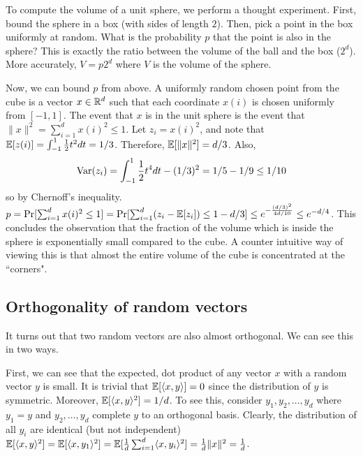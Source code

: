 \documentclass{article}
\begin{document}
To compute the volume of a unit sphere, we perform a thought experiment.
First, bound the sphere in a box (with sides of length $2$).
Then, pick a point in the box uniformly at random. What is the probability $p$ that
the point is also in the sphere? This is exactly the ratio between the volume of the ball and the box ($2^d$).
More accurately, $V = p2^d$ where $V$ is the volume of the sphere.

Now, we can bound $p$ from above. 
A uniformly random chosen point from the cube is a vector $x \in {\mathbb{R}}^d$ such that each coordinate $x(i)$
is chosen uniformly from $[-1,1]$. The event that $x$ is in the unit sphere is the event that $\|x\|^2 = \sum_{i=1}^{d}x(i)^2 \le 1$.
Let $z_i = x(i)^2$, and note that 
${\mathbb E}[z(i)] = \int_{-1}^{1}\frac{1}{2}t^2 dt = 1/3$. Therefore, ${\mathbb E}[\|x\|^2] = d/3$. 
Also, 
\[
{\operatorname{Var}}(z_i)  = \int_{-1}^{1}\frac{1}{2}t^4 dt  - (1/3)^2  = 1/5 - 1/9 \le 1/10
\]
so by Chernoff's inequality.
$p = \Pr[\sum_{i=1}^{d}x(i)^2 \le 1]  = \Pr[\sum_{i=1}^{d}(z_i -{\mathbb E}[z_i] ) \le 1-d/3] \le e^{-\frac{(d/3)^2}{4d/10}} \le e^{-d/4}$.
This concludes the observation that the fraction of the volume which is inside the sphere is 
exponentially small compared to the cube.
A counter intuitive way of viewing this is that almost the entire volume of the cube is concentrated at the ``corners".

\subsection{Orthogonality of random vectors}

It turns out that two random vectors are also almost orthogonal.
We can see this in two ways.

First, we can see that the expected, dot product of any vector $x$ with a random vector $y$ is small.
It is trivial that ${\mathbb E}[\langle x,y \rangle] = 0$ since the distribution of $y$ is symmetric.
Moreover, ${\mathbb E}[\langle x,y \rangle^2] = 1/d$.
To see this, consider $y_1,y_2,\ldots,y_d$ where $y_1 = y$ and $y_2,\ldots,y_d$ complete $y$ to an orthogonal basis.
Clearly, the distribution of all $y_i$ are identical (but not independent)
${\mathbb E}[\langle x,y \rangle^2] = {\mathbb E}[\langle x,y_1\rangle^2] = {\mathbb E}[\frac{1}{d}\sum_{i=1}^{d}\langle x,y_i\rangle^2] = \frac{1}{d}\|x\|^2 = \frac{1}{d}$.
\end{document}
